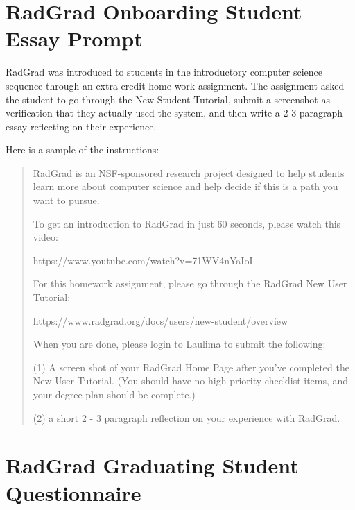 \documentclass[acmsmall]{acmart}
\begin{document}
\appendix

\section{RadGrad Onboarding Student Essay Prompt}
\label{sec:onboarding-student-essay-prompt}

RadGrad was introduced to students in the introductory computer science sequence through an extra credit home work assignment. The assignment asked the student to go through the New Student Tutorial, submit a screenshot as verification that they actually used the system, and then write a 2-3 paragraph essay reflecting on their experience.

Here is a sample of the instructions:

\begin{quotation}
RadGrad is an NSF-sponsored research project designed to help students learn more about computer science and help decide if this is a path you want to pursue.

\medskip

\noindent To get an introduction to RadGrad in just 60 seconds, please watch this video:

https://www.youtube.com/watch?v=71WV4nYaIoI

\medskip

\noindent For this homework assignment, please go through the RadGrad New User Tutorial:

https://www.radgrad.org/docs/users/new-student/overview

\medskip

\noindent When you are done, please login to Laulima to submit the following:

(1) A screen shot of your RadGrad Home Page after you’ve completed the New User Tutorial. (You should have no high priority checklist items, and your degree plan should be complete.)

(2) a short 2 - 3 paragraph reflection on your experience with RadGrad.
\end{quotation}


\section{RadGrad Graduating Student Questionnaire}
\label{sec:graduating-student-questionnaire}
\end{document}
